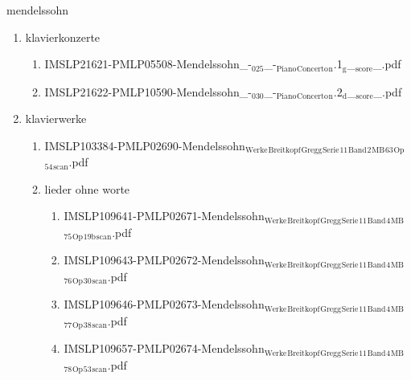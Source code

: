 \documentclass[11pt]{article}
\begin{document}
\item mendelssohn
\label{sec-1-1-1-1-44-45}
\begin{enumerate}
\item klavierkonzerte
\label{sec-1-1-1-1-44-45-1}
\begin{enumerate}
\item IMSLP21621-PMLP05508-Mendelssohn\_-$_{\text{025}}$\_-$_{\text{Piano}}$$_{\text{Concerto}}$$_{\text{n}}$.1$_{\text{g}}$\_$_{\text{score}}$\_.pdf
\label{sec-1-1-1-1-44-45-1-1}

\item IMSLP21622-PMLP10590-Mendelssohn\_-$_{\text{030}}$\_-$_{\text{Piano}}$$_{\text{Concerto}}$$_{\text{n}}$.2$_{\text{d}}$\_$_{\text{score}}$\_.pdf
\label{sec-1-1-1-1-44-45-1-2}
\end{enumerate}

\item klavierwerke
\label{sec-1-1-1-1-44-45-2}
\begin{enumerate}
\item IMSLP103384-PMLP02690-Mendelssohn$_{\text{Werke}}$$_{\text{Breitkopf}}$$_{\text{Gregg}}$$_{\text{Serie}}$$_{\text{11}}$$_{\text{Band}}$$_{\text{2}}$$_{\text{MB}}$$_{\text{63}}$$_{\text{Op}}$$_{\text{54}}$$_{\text{scan}}$.pdf
\label{sec-1-1-1-1-44-45-2-1}

\item lieder ohne worte
\label{sec-1-1-1-1-44-45-2-2}
\begin{enumerate}
\item IMSLP109641-PMLP02671-Mendelssohn$_{\text{Werke}}$$_{\text{Breitkopf}}$$_{\text{Gregg}}$$_{\text{Serie}}$$_{\text{11}}$$_{\text{Band}}$$_{\text{4}}$$_{\text{MB}}$$_{\text{75}}$$_{\text{Op}}$$_{\text{19b}}$$_{\text{scan}}$.pdf
\label{sec-1-1-1-1-44-45-2-2-1}

\item IMSLP109643-PMLP02672-Mendelssohn$_{\text{Werke}}$$_{\text{Breitkopf}}$$_{\text{Gregg}}$$_{\text{Serie}}$$_{\text{11}}$$_{\text{Band}}$$_{\text{4}}$$_{\text{MB}}$$_{\text{76}}$$_{\text{Op}}$$_{\text{30}}$$_{\text{scan}}$.pdf
\label{sec-1-1-1-1-44-45-2-2-2}

\item IMSLP109646-PMLP02673-Mendelssohn$_{\text{Werke}}$$_{\text{Breitkopf}}$$_{\text{Gregg}}$$_{\text{Serie}}$$_{\text{11}}$$_{\text{Band}}$$_{\text{4}}$$_{\text{MB}}$$_{\text{77}}$$_{\text{Op}}$$_{\text{38}}$$_{\text{scan}}$.pdf
\label{sec-1-1-1-1-44-45-2-2-3}

\item IMSLP109657-PMLP02674-Mendelssohn$_{\text{Werke}}$$_{\text{Breitkopf}}$$_{\text{Gregg}}$$_{\text{Serie}}$$_{\text{11}}$$_{\text{Band}}$$_{\text{4}}$$_{\text{MB}}$$_{\text{78}}$$_{\text{Op}}$$_{\text{53}}$$_{\text{scan}}$.pdf
\label{sec-1-1-1-1-44-45-2-2-4}


\end{enumerate}
\end{enumerate}
\end{enumerate}
\end{document}
